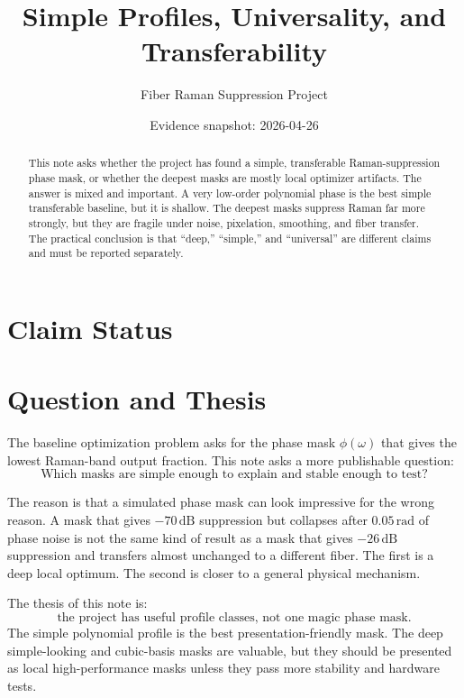 \documentclass[11pt]{article}
\title{Simple Profiles, Universality, and Transferability}
\author{Fiber Raman Suppression Project}
\date{Evidence snapshot: 2026-04-26}
\begin{document}
\maketitle

\begin{abstract}
This note asks whether the project has found a simple, transferable
Raman-suppression phase mask, or whether the deepest masks are mostly local
optimizer artifacts. The answer is mixed and important. A very low-order
polynomial phase is the best simple transferable baseline, but it is shallow.
The deepest masks suppress Raman far more strongly, but they are fragile under
noise, pixelation, smoothing, and fiber transfer. The practical conclusion is
that ``deep,'' ``simple,'' and ``universal'' are different claims and must be
reported separately.
\end{abstract}

\section*{Claim Status}

\section{Question and Thesis}

The baseline optimization problem asks for the phase mask \(\phi(\omega)\)
that gives the lowest Raman-band output fraction. This note asks a more
publishable question:
\[
    \text{Which masks are simple enough to explain and stable enough to test?}
\]

The reason is that a simulated phase mask can look impressive for the wrong
reason. A mask that gives \(-70\,\mathrm{dB}\) suppression but collapses after
\(0.05\,\mathrm{rad}\) of phase noise is not the same kind of result as a mask
that gives \(-26\,\mathrm{dB}\) suppression and transfers almost unchanged to a
different fiber. The first is a deep local optimum. The second is closer to a
general physical mechanism.

The thesis of this note is:
\[
    \text{the project has useful profile classes, not one magic phase mask.}
\]
The simple polynomial profile is the best presentation-friendly mask.
The deep simple-looking and cubic-basis masks are valuable, but they should be
presented as local high-performance masks unless they pass more stability and
hardware tests.
\end{document}

